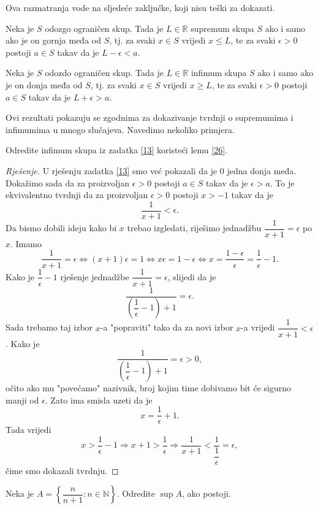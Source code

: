 Ova razmatranja vode na sljedeće zaključke, koji nisu teški za dokazati.
\begin{lemma}
\label{14}
Neka je $S$ odozgo ograničen skup. Tada je $L\in \mathbb{R}$ supremum skupa $S$ ako i samo ako je on gornja međa od $S$, tj. za svaki $x\in S$ vrijedi $x\leq L$, te za svaki $\epsilon >0$ postoji $a\in S$ takav da je $L-\epsilon<a$.
\end{lemma}
\begin{lemma}
\label{26}
Neka je $S$ odozdo ograničen skup. Tada je $L\in \mathbb{R}$ infimum skupa $S$ ako i samo ako je on donja međa od $S$, tj. za svaki $x\in S$ vrijedi $x\geq L$, te za svaki $\epsilon >0$ postoji $a\in S$ takav da je $L+\epsilon>a$.
\end{lemma}
Ovi rezultati pokazuju se zgodnima za dokazivanje tvrdnji o supremumima i infimumima u mnogo slučajeva. Navedimo nekoliko primjera.
\begin{exercise}
Odredite infimum skupa iz zadatka \ref{13} koristeći lemu \ref{26}.
\end{exercise}
\begin{proof}[Rješenje]
U rješenju zadatka \ref{13} smo već pokazali da je $0$ jedna donja međa. Dokažimo sada da za proizvoljan $\epsilon>0$ postoji $a\in S$ takav da je $\epsilon>a$. To je ekvivalentno tvrdnji da za proizvoljan $\epsilon>0$ postoji $x>-1$ takav da je $$\dfrac{1}{x+1}<\epsilon.$$ Da bismo dobili ideju kako bi $x$ trebao izgledati, riješimo jednadžbu $\dfrac{1}{x+1}=\epsilon$ po $x$. Imamo
$$\dfrac{1}{x+1}=\epsilon \Leftrightarrow (x+1)\epsilon=1\Leftrightarrow x\epsilon=1-\epsilon\Leftrightarrow x=\dfrac{1-\epsilon}{\epsilon}=\dfrac{1}{\epsilon}-1.$$
Kako je $\dfrac{1}{\epsilon}-1$ rješenje jednadžbe $\dfrac{1}{x+1}=\epsilon$, slijedi da je $$\dfrac{1}{\left(\dfrac{1}{\epsilon}-1\right)+1}=\epsilon.$$ Sada trebamo taj izbor $x$-a "popraviti" tako da za novi izbor $x$-a vrijedi $\dfrac{1}{x+1}<\epsilon$. Kako je $$\dfrac{1}{\left(\dfrac{1}{\epsilon}-1\right)+1}=\epsilon>0,$$ očito ako mu "povećamo" nazivnik, broj kojim time dobivamo bit će sigurno manji od $\epsilon$. Zato ima smisla uzeti da je $$x=\dfrac{1}{\epsilon}+1.$$ Tada vrijedi
$$x>\dfrac{1}{\epsilon}-1\Rightarrow x+1>\dfrac{1}{\epsilon}\Rightarrow \dfrac{1}{x+1}<\dfrac{1}{\dfrac{1}{\epsilon}}=\epsilon,$$
čime smo dokazali tvrdnju.
\end{proof}
\begin{exercise}
Neka je $A=\left\{\dfrac{n}{n+1} : n\in \mathbb{N}\right\}$. Odredite $\sup{A}$, ako postoji.
\end{exercise}
